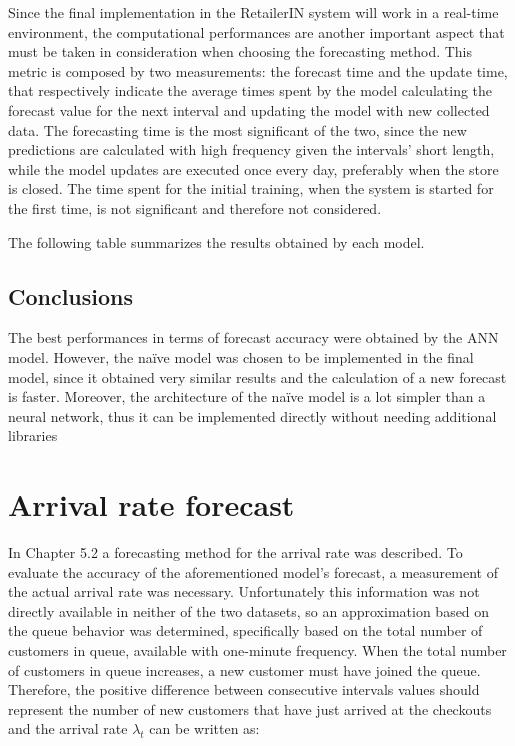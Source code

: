 Since the final implementation in the RetailerIN system will work in a real-time environment, the computational performances are another important aspect that must be taken in consideration when choosing the forecasting method. This metric is composed by two measurements: the forecast time and the update time, that respectively indicate the average times spent by the model calculating the forecast value for the next interval and updating the model with new collected data. The forecasting time is the most significant of the two, since the new predictions are calculated with high frequency given the intervals’ short length, while the model updates are executed once every day, preferably when the store is closed. The time spent for the initial training, when the system is started for the first time, is not significant and therefore not considered.

The following table summarizes the results obtained by each model.

\subsection{Conclusions}
\label{subsec:conclusions}
The best performances in terms of forecast accuracy were obtained by the ANN model. However, the naïve model was chosen to be implemented in the final model, since it obtained very similar results and the calculation of a new forecast is faster. Moreover, the architecture of the naïve model is a lot simpler than a neural network, thus it can be implemented directly without needing additional libraries

\section{Arrival rate forecast}
\label{sec:arrival_rate_forecast}
In Chapter 5.2 a forecasting method for the arrival rate was described. To evaluate the accuracy of the aforementioned model’s forecast, a measurement of the actual arrival rate was necessary. Unfortunately this information was not directly available in neither of the two datasets, so an approximation based on the queue behavior was determined, specifically based on the total number of customers in queue, available with one-minute frequency. When the total number of customers in queue increases, a new customer must have joined the queue. Therefore, the positive difference between consecutive intervals values should represent the number of new customers that have just arrived at the checkouts and the arrival rate $ \lambda_t $ can be written as:

